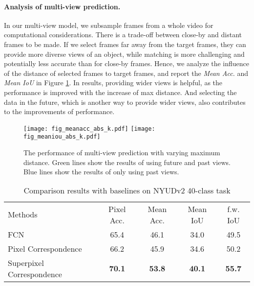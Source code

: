\paragraph{Analysis of multi-view prediction.}
In our multi-view model, we subsample frames from a whole video for computational considerations.
There is a trade-off between close-by and distant frames to be made.
If we select frames far away from the target frames, they can provide more diverse views of an object, while matching is more challenging and potentially less accurate than for close-by frames.
Hence, we analyze the influence of the distance of selected frames to target frames, and report the \textit{Mean Acc.} and \textit{Mean IoU} in Figure \ref{fig:statistics_max_k}.
In results, providing wider views is helpful, as the performance is improved with the increase of max distance.
And selecting the data in the future, which is another way to provide wider views, also contributes to the improvements of performance.

\begin{figure}[!t]
\begin{center}
   \texttt{[image: fig\_meanacc\_abs\_k.pdf]}
   \texttt{[image: fig\_meaniou\_abs\_k.pdf]}
   \end{center}
   \caption{The performance of multi-view prediction with varying maximum distance.
   Green lines show the results of using future and past views.
   Blue lines show the results of only using past views. }
\label{fig:statistics_max_k}
\end{figure}

\begin{table}[t!]
\scriptsize
  \begin{center}
    \caption{Comparison results with baselines on NYUDv2 40-class task}
    \label{table:table_baseline}
    \begin{tabular}{lcccc}
      \toprule
      Methods & Pixel Acc.  & Mean Acc. & Mean IoU & f.w. IoU \\
      \cmidrule(lr){1-1}\cmidrule(lr){2-5}
      FCN \cite{long2015fully} & 65.4  & 46.1 & 34.0  & 49.5  \\
Pixel Correspondence  & 66.2 & 45.9 & 34.6  & 50.2 \\
      Superpixel Correspondence & \textbf{70.1} & \textbf{53.8} & \textbf{40.1} & \textbf{55.7} \\
      \bottomrule
    \end{tabular}
  \end{center}
\end{table}

